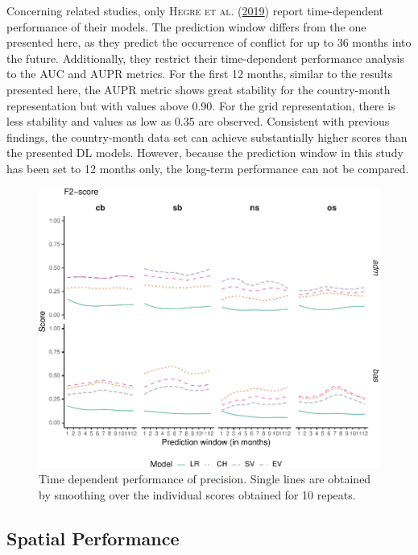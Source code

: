 \documentclass[a4paper,11pt]{article}
\begin{document}
Concerning related studies, only \textsc{\textnormal{Hegre} \textnormal{et al.}} \textsc{(\textnormal{\protect\hyperlink{ref-hegre2019}{2019}})} report time-dependent performance of
their models. The prediction window differs from the one presented here, as they
predict the occurrence of conflict for up to 36 months into the future. Additionally,
they restrict their time-dependent performance analysis to the AUC and AUPR metrics.
For the first 12 months, similar to the results presented here, the AUPR metric
shows great stability for the country-month representation but with values above
0.90. For the grid representation, there is less stability and values as low as 0.35
are observed. Consistent with previous findings, the country-month data set can
achieve substantially higher scores than the presented DL models. However, because
the prediction window in this study has been set to 12 months only, the long-term
performance can not be compared.
\begin{figure}[H]

{\centering \includegraphics{thesis_files/figure-latex/04-results-time-precision-1} 

}

\caption[Time dependent performance of precision.]{Time dependent performance of precision. Single lines are obtained by smoothing over the individual scores obtained for 10 repeats.}\label{fig:04-results-time-precision}
\end{figure}
\newpage

\hypertarget{spatial-performance}{%
\subsection{Spatial Performance}\label{spatial-performance}}
\end{document}
